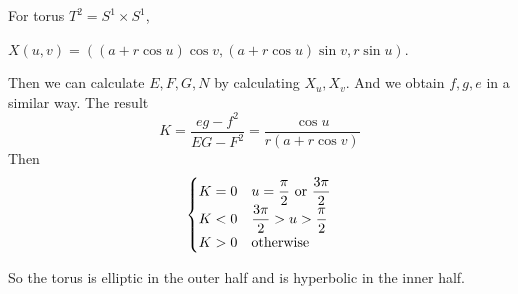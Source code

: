 \begin{example}
    For torus  $ T^2=S^1\times S^1 $, 
    
    $ X(u,v)=((a+r\cos u)\cos v,(a+r\cos u)\sin v,r\sin u) $.

    Then we can calculate  $ E,F,G,N $ by calculating  $ X_u,X_v $. And we obtain  $ f,g,e $ in a similar way. The result 
    \[K=\frac{eg-f^2}{EG-F^2}=\frac{\cos u}{r(a+r\cos v)}\]  
    Then 
    \[\begin{cases}
        K=0&u=\displaystyle\frac{\pi}{2}\text{ or }\frac{3\pi}{2}\\
        K<0&\displaystyle\frac{3\pi}{2}>u>\frac{\pi}{2}\\
        K>0&\text{otherwise}
    \end{cases}\] 

    So the torus is elliptic in the outer half and is hyperbolic in the inner half. 

    \begin{center}     
    \end{center}
    
\end{example}

